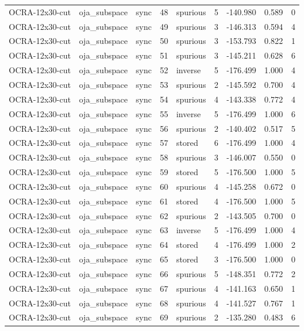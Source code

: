 \begin{tabular}{lllrlrrrr}
OCRA-12x30-cut & oja\_subspace & sync & 48 & spurious & 5 & -140.980 & 0.589 & 0 \\
OCRA-12x30-cut & oja\_subspace & sync & 49 & spurious & 3 & -146.313 & 0.594 & 4 \\
OCRA-12x30-cut & oja\_subspace & sync & 50 & spurious & 3 & -153.793 & 0.822 & 1 \\
OCRA-12x30-cut & oja\_subspace & sync & 51 & spurious & 3 & -145.211 & 0.628 & 6 \\
OCRA-12x30-cut & oja\_subspace & sync & 52 & inverse & 5 & -176.499 & 1.000 & 4 \\
OCRA-12x30-cut & oja\_subspace & sync & 53 & spurious & 2 & -145.592 & 0.700 & 4 \\
OCRA-12x30-cut & oja\_subspace & sync & 54 & spurious & 4 & -143.338 & 0.772 & 4 \\
OCRA-12x30-cut & oja\_subspace & sync & 55 & inverse & 5 & -176.499 & 1.000 & 6 \\
OCRA-12x30-cut & oja\_subspace & sync & 56 & spurious & 2 & -140.402 & 0.517 & 5 \\
OCRA-12x30-cut & oja\_subspace & sync & 57 & stored & 6 & -176.499 & 1.000 & 4 \\
OCRA-12x30-cut & oja\_subspace & sync & 58 & spurious & 3 & -146.007 & 0.550 & 0 \\
OCRA-12x30-cut & oja\_subspace & sync & 59 & stored & 5 & -176.500 & 1.000 & 5 \\
OCRA-12x30-cut & oja\_subspace & sync & 60 & spurious & 4 & -145.258 & 0.672 & 0 \\
OCRA-12x30-cut & oja\_subspace & sync & 61 & stored & 4 & -176.500 & 1.000 & 5 \\
OCRA-12x30-cut & oja\_subspace & sync & 62 & spurious & 2 & -143.505 & 0.700 & 0 \\
OCRA-12x30-cut & oja\_subspace & sync & 63 & inverse & 5 & -176.499 & 1.000 & 4 \\
OCRA-12x30-cut & oja\_subspace & sync & 64 & stored & 4 & -176.499 & 1.000 & 2 \\
OCRA-12x30-cut & oja\_subspace & sync & 65 & stored & 3 & -176.500 & 1.000 & 0 \\
OCRA-12x30-cut & oja\_subspace & sync & 66 & spurious & 5 & -148.351 & 0.772 & 2 \\
OCRA-12x30-cut & oja\_subspace & sync & 67 & spurious & 4 & -141.163 & 0.650 & 1 \\
OCRA-12x30-cut & oja\_subspace & sync & 68 & spurious & 4 & -141.527 & 0.767 & 1 \\
OCRA-12x30-cut & oja\_subspace & sync & 69 & spurious & 2 & -135.280 & 0.483 & 6 \\

\end{tabular}
